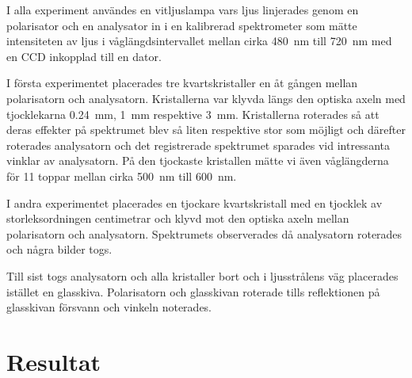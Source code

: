 \documentclass[a4paper]{article}
\begin{document}
  I alla experiment användes en vitljuslampa vars ljus linjerades genom en polarisator och en analysator in i en kalibrerad spektrometer som mätte intensiteten av ljus i våglängdsintervallet mellan cirka \SI{480}{\nano\meter} till \SI{720}{\nano\meter} med en CCD inkopplad till en dator.
  
  I första experimentet placerades tre kvartskristaller en åt gången mellan polarisatorn och analysatorn. Kristallerna var klyvda längs den optiska axeln med tjocklekarna \SI{0.24}{\milli\meter}, \SI{1}{\milli\meter} respektive \SI{3}{\milli\meter}. Kristallerna roterades så att deras effekter på spektrumet blev så liten respektive stor som möjligt och därefter roterades analysatorn och det registrerade spektrumet sparades vid intressanta vinklar av analysatorn. På den tjockaste kristallen mätte vi även våglängderna för 11 toppar mellan cirka \SI{500}{\nano\meter} till \SI{600}{\nano\meter}.
  
  I andra experimentet placerades en tjockare kvartskristall med en tjocklek av storleksordningen centimetrar och klyvd mot den optiska axeln mellan polarisatorn och analysatorn. Spektrumets observerades då analysatorn roterades och några bilder togs.
  
  Till sist togs analysatorn och alla kristaller bort och i ljusstrålens väg placerades istället en glasskiva. Polarisatorn och glasskivan roterade tills reflektionen på glasskivan försvann och vinkeln noterades.

\section{Resultat}

\FloatBarrier

\end{document}

